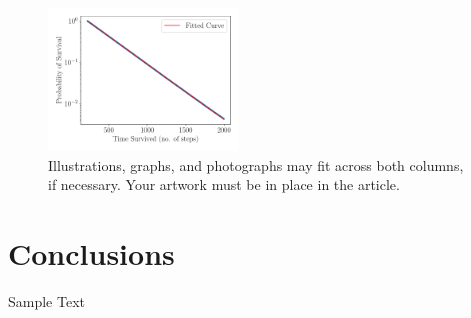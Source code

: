 \documentclass[journal]{IEEEtran}
\begin{document}
\begin{figure}[H]%
  \begin{center}
    \includegraphics[width=0.45\textwidth]{images/cum_line_plot_cutoff.pdf}
    \caption{Illustrations, graphs, and photographs may fit across both columns, if necessary. Your artwork must be in place in the article.}
    \label{fig:cum_line_cutoff_plot}
  \end{center}
\end{figure}

\section{Conclusions}

Sample Text



%
\end{document}
